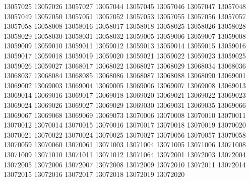 13057025
13057026
13057027
13057044
13057045
13057046
13057047
13057048
13057049
13057050
13057051
13057052
13057053
13057055
13057056
13057057
13057058
13058008
13058016
13058017
13058018
13058025
13058026
13058028
13058029
13058030
13058031
13058032
13059005
13059006
13059007
13059008
13059009
13059010
13059011
13059012
13059013
13059014
13059015
13059016
13059017
13059018
13059019
13059020
13059021
13059022
13059023
13059025
13059026
13059027
13068017
13068022
13068027
13068029
13068034
13068036
13068037
13068084
13068085
13068086
13068087
13068088
13068090
13069001
13069002
13069003
13069004
13069005
13069006
13069007
13069008
13069013
13069014
13069016
13069017
13069018
13069020
13069021
13069022
13069023
13069024
13069026
13069027
13069029
13069030
13069031
13069035
13069066
13069067
13069068
13069069
13069073
13070006
13070008
13070010
13070011
13070012
13070014
13070015
13070016
13070017
13070018
13070019
13070020
13070021
13070022
13070024
13070025
13070027
13070056
13070057
13070058
13070059
13070060
13070061
13071003
13071004
13071005
13071006
13071008
13071009
13071010
13071011
13071012
13071064
13072001
13072003
13072004
13072005
13072006
13072007
13072008
13072009
13072010
13072011
13072014
13072015
13072016
13072017
13072018
13072019
13072020
